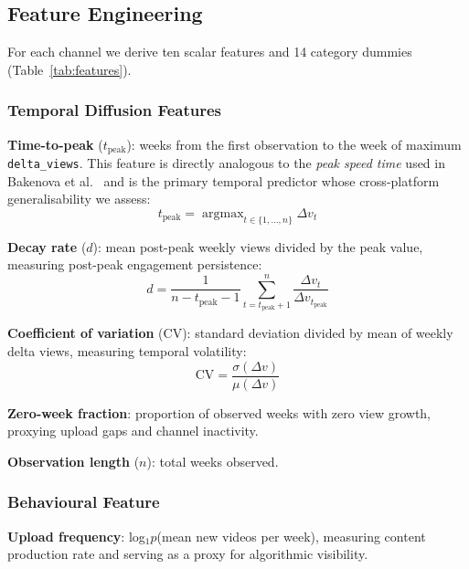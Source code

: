 \documentclass[journal,article,submit,pdftex,moreauthors]{Definitions/mdpi}
\begin{document}
\subsection{Feature Engineering}
\label{sec:features}

For each channel we derive ten scalar features and 14 category dummies
(Table~\ref{tab:features}).

\subsubsection{Temporal Diffusion Features}

\textbf{Time-to-peak} ($t_\text{peak}$): weeks from the first observation
to the week of maximum \texttt{delta\_views}.
This feature is directly analogous to the \emph{peak speed time} used in
Bakenova et al.\ \cite{ref-paper1} and is the primary temporal predictor
whose cross-platform generalisability we assess:
\begin{equation}
    t_\text{peak} = \operatorname{argmax}_{t \in \{1,\ldots,n\}} \Delta v_t
    \label{eq:ttp}
\end{equation}

\textbf{Decay rate} ($d$): mean post-peak weekly views divided by the
peak value, measuring post-peak engagement persistence:
\begin{equation}
    d = \frac{1}{n - t_\text{peak} - 1}
        \sum_{t = t_\text{peak}+1}^{n}
        \frac{\Delta v_t}{\Delta v_{t_\text{peak}}}
    \label{eq:decay}
\end{equation}

\textbf{Coefficient of variation} (CV): standard deviation divided by
mean of weekly delta views, measuring temporal volatility:
\begin{equation}
    \text{CV} = \frac{\sigma(\Delta v)}{\mu(\Delta v)}
    \label{eq:cv}
\end{equation}

\textbf{Zero-week fraction}: proportion of observed weeks with zero view
growth, proxying upload gaps and channel inactivity.

\textbf{Observation length} ($n$): total weeks observed.

\subsubsection{Behavioural Feature}

\textbf{Upload frequency}: log$_{1}p$(mean new videos per week), measuring
content production rate and serving as a proxy for algorithmic visibility.
\end{document}
